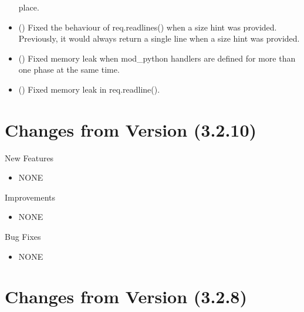 \begin{itemize}
      place.
    \item
      ()
      Fixed the behaviour of req.readlines() when a size hint was provided. Previously,
      it would always return a single line when a size hint was provided.
    \item
      ()
      Fixed memory leak when mod_python handlers are defined for more than
      one phase at the same time.
    \item
      ()
      Fixed memory leak in req.readline().
  \end{itemize}


\chapter{Changes from Version (3.2.10)\label{app-changes-from-3.2.10}}


  New Features

  \begin{itemize}
    \item
      NONE
  \end{itemize}

  Improvements

  \begin{itemize}
    \item
      NONE
  \end{itemize}

  Bug Fixes

  \begin{itemize}
    \item
      NONE
  \end{itemize}

\chapter{Changes from Version (3.2.8)\label{app-changes}}

